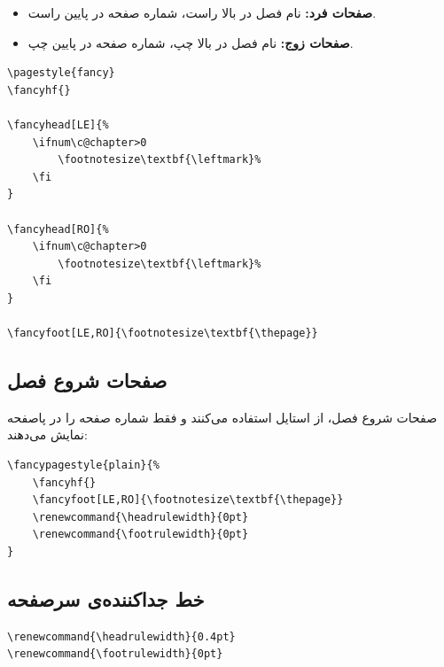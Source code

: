 \begin{itemize}
    \item \textbf{صفحات فرد:} نام فصل در بالا
    راست، شماره صفحه در پایین راست.
    \item \textbf{صفحات زوج:} نام فصل در بالا
    چپ، شماره صفحه در پایین چپ.
\end{itemize}

\begin{latin}
\begin{verbatim}
\pagestyle{fancy}
\fancyhf{}

\fancyhead[LE]{%
    \ifnum\c@chapter>0
        \footnotesize\textbf{\leftmark}%
    \fi
}

\fancyhead[RO]{%
    \ifnum\c@chapter>0
        \footnotesize\textbf{\leftmark}%
    \fi
}

\fancyfoot[LE,RO]{\footnotesize\textbf{\thepage}}
\end{verbatim}
\end{latin}


\subsection{صفحات شروع فصل}
\label{sec:layout-headers-plain}

صفحات شروع فصل، از استایل  استفاده
می‌کنند و فقط شماره صفحه را در پاصفحه
نمایش می‌دهند:

\begin{latin}
\begin{verbatim}
\fancypagestyle{plain}{%
    \fancyhf{}
    \fancyfoot[LE,RO]{\footnotesize\textbf{\thepage}}
    \renewcommand{\headrulewidth}{0pt}
    \renewcommand{\footrulewidth}{0pt}
}
\end{verbatim}
\end{latin}


\subsection{خط جداکننده‌ی سرصفحه}
\label{sec:layout-headers-rule}

\begin{latin}
\begin{verbatim}
\renewcommand{\headrulewidth}{0.4pt}
\renewcommand{\footrulewidth}{0pt}
\end{verbatim}
\end{latin}

